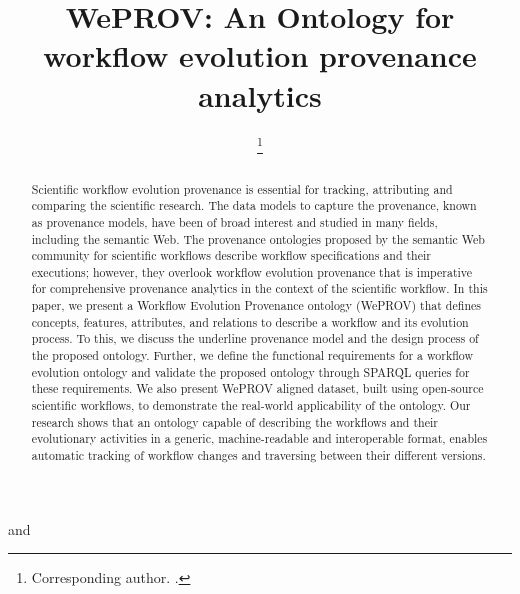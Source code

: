 \documentclass[ao]{iosart2x}
\begin{document}
\begin{frontmatter}

\title{WePROV: An Ontology for workflow evolution provenance analytics}



\author{ %
\thanks{Corresponding author. .}%
} and \author{ }
\address{CSIRO , . }



\begin{abstract}
Scientific workflow evolution provenance is essential for tracking, attributing and comparing the scientific research. 
The data models to capture the provenance, known as provenance models, have been of broad interest and studied in many fields, including the semantic Web. The provenance ontologies proposed by the semantic Web community for scientific workflows describe workflow specifications and their executions; however, they overlook workflow evolution provenance that is imperative for comprehensive provenance analytics in the context of the scientific workflow.
In this paper, we present a Workflow Evolution Provenance ontology (WePROV) that defines concepts, features, attributes, and relations to describe a workflow and its evolution process. To this, we discuss the underline provenance model and the design process of the proposed ontology.
Further, we define the functional requirements for a workflow evolution ontology and validate the proposed ontology through SPARQL queries for these requirements. We also present WePROV aligned dataset, built using open-source scientific workflows, to demonstrate the real-world applicability of the ontology. 
Our research shows that an ontology capable of describing the workflows and their evolutionary activities in a generic, machine-readable and interoperable format, enables automatic tracking of workflow changes and traversing between their different versions. 
\end{abstract}

\begin{keyword}
\end{keyword}

\end{frontmatter}
\end{document}
